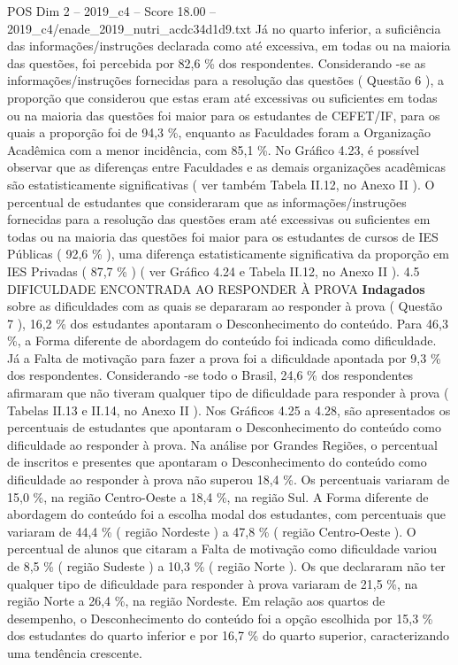 \begin{textsample}{POS Dim 2 – 2019\_c4 – Score 18.00 – 2019\_c4/enade\_2019\_nutri\_acdc34d1d9.txt}
Já no quarto inferior, a suficiência das informações/instruções declarada como até excessiva, em todas ou na maioria das questões, foi percebida por 82,6 \% dos respondentes.
Considerando -se as informações/instruções fornecidas para a resolução das questões ( Questão 6 ), a proporção que considerou que estas eram até excessivas ou suficientes em todas ou na maioria das questões foi maior para os estudantes de CEFET/IF, para os quais a proporção foi de 94,3 \%, enquanto as Faculdades foram a Organização Acadêmica com a menor incidência, com 85,1 \%.
No Gráfico 4.23, é possível observar que as diferenças entre Faculdades e as demais organizações acadêmicas são estatisticamente significativas ( ver também Tabela II.12, no Anexo II ).
O percentual de estudantes que consideraram que as informações/instruções fornecidas para a resolução das questões eram até excessivas ou suficientes em todas ou na maioria das questões foi maior para os estudantes de cursos de IES Públicas ( 92,6 \% ), uma diferença estatisticamente significativa da proporção em IES Privadas ( 87,7 \% ) ( ver Gráfico 4.24 e Tabela II.12, no Anexo II ). 4.5 DIFICULDADE ENCONTRADA AO RESPONDER À PROVA \textbf{Indagados} sobre as dificuldades com as quais se depararam ao responder à prova ( Questão 7 ), 16,2 \% dos estudantes apontaram o Desconhecimento do conteúdo.
Para 46,3 \%, a Forma diferente de abordagem do conteúdo foi indicada como dificuldade.
Já a Falta de motivação para fazer a prova foi a dificuldade apontada por 9,3 \% dos respondentes.
Considerando -se todo o Brasil, 24,6 \% dos respondentes afirmaram que não tiveram qualquer tipo de dificuldade para responder à prova ( Tabelas II.13 e II.14, no Anexo II ).
Nos Gráficos 4.25 a 4.28, são apresentados os percentuais de estudantes que apontaram o Desconhecimento do conteúdo como dificuldade ao responder à prova.
Na análise por Grandes Regiões, o percentual de inscritos e presentes que apontaram o Desconhecimento do conteúdo como dificuldade ao responder à prova não superou 18,4 \%.
Os percentuais variaram de 15,0 \%, na região Centro-Oeste a 18,4 \%, na região Sul.
A Forma diferente de abordagem do conteúdo foi a escolha modal dos estudantes, com percentuais que variaram de 44,4 \% ( região Nordeste ) a 47,8 \% ( região Centro-Oeste ).
O percentual de alunos que citaram a Falta de motivação como dificuldade variou de 8,5 \% ( região Sudeste ) a 10,3 \% ( região Norte ).
Os que declararam não ter qualquer tipo de dificuldade para responder à prova variaram de 21,5 \%, na região Norte a 26,4 \%, na região Nordeste.
Em relação aos quartos de desempenho, o Desconhecimento do conteúdo foi a opção escolhida por 15,3 \% dos estudantes do quarto inferior e por 16,7 \% do quarto superior, caracterizando uma tendência crescente.

\end{textsample}
